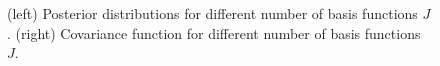 \documentclass[]{interact}
\theoremstyle{plain}%
\theoremstyle{definition}
\theoremstyle{remark}
\begin{document}
\begin{figure}[H]
\centering
{}
\caption{(left) Posterior distributions for different number of basis functions $J$. (right) Covariance function for different number of basis functions $J$.}
  \label{fig1_Post_J}
\end{figure}
\end{document}
